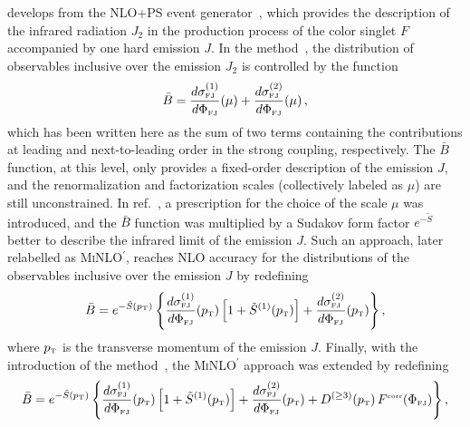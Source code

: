 \documentclass[11pt,a4paper]{article}
\begin{document}
\minnlo{} develops from the NLO+PS \POWHEG{} event
generator~\cite{Alioli:2010xd}, which provides the description of the
infrared radiation $J_2$ in the production process of the color
singlet $F$ accompanied by one hard emission $J$. In the \POWHEG{}
method~\cite{Frixione:2007vw}, the distribution of observables
inclusive over the emission $J_2$ is controlled by the function
\begin{equation}
  \bar{B} = \frac{d\sigma_{\scriptscriptstyle\rm
      FJ}^{(1)}}{d\Phi_{\scriptscriptstyle\rm FJ}}\!\left(\mu\right) +
  \frac{d\sigma_{\scriptscriptstyle\rm
      FJ}^{(2)}}{d\Phi_{\scriptscriptstyle\rm FJ}}\!\left(\mu\right),
\end{equation}
which has been written here as the sum of two terms containing the
contributions at leading and next-to-leading order in the strong
coupling, respectively. The $\bar{B}$ function, at this level, only
provides a fixed-order description of the emission $J$, and the
renormalization and factorization scales (collectively labeled as
$\mu$) are still unconstrained. In ref.~\cite{Hamilton:2012rf}, a
prescription for the choice of the scale $\mu$ was introduced, and the
$\bar{B}$ function was multiplied by a Sudakov form factor
$e^{-\tilde{S}}$ better to describe the infrared limit of the emission
$J$. Such an approach, later relabelled as {\small
  \textsc{MiNLO$^\prime$}}, reaches NLO accuracy for the distributions
of the observables inclusive over the emission $J$ by redefining
\begin{equation}
  \bar{B} = e^{-\tilde{S}\left(p_{\scriptscriptstyle\rm T}\right)}
  \left\{\frac{d\sigma_{\scriptscriptstyle\rm
      FJ}^{(1)}}{d\Phi_{\scriptscriptstyle\rm
      FJ}}\!\left(p_{\scriptscriptstyle\rm T}\right) \left[1 +
    \tilde{S}^{(1)}\!\left(p_{\scriptscriptstyle\rm T}\right)\right] +
  \frac{d\sigma_{\scriptscriptstyle\rm
      FJ}^{(2)}}{d\Phi_{\scriptscriptstyle\rm
      FJ}}\!\left(p_{\scriptscriptstyle\rm T}\right)\right\},
\end{equation}
where $p_{\scriptscriptstyle\rm T}$ is the transverse momentum of the
emission $J$. Finally, with the introduction of the \minnlo{}
method~\cite{Monni:2019whf,Monni:2020nks}, the {\small
  \textsc{MiNLO$^\prime$}} approach was extended by redefining
\begin{equation}
  \label{MiNNLOPS_cross_section}
  \bar{B} = e^{-\tilde{S}\left(p_{\scriptscriptstyle\rm T}\right)}
  \left\{\frac{d\sigma_{\scriptscriptstyle\rm
      FJ}^{(1)}}{d\Phi_{\scriptscriptstyle\rm
      FJ}}\!\left(p_{\scriptscriptstyle\rm T}\right) \left[1 +
    \tilde{S}^{(1)}\!\left(p_{\scriptscriptstyle\rm T}\right)\right] +
  \frac{d\sigma_{\scriptscriptstyle\rm
      FJ}^{(2)}}{d\Phi_{\scriptscriptstyle\rm
      FJ}}\!\left(p_{\scriptscriptstyle\rm T}\right) + D^{(\geq
    3)}\!\left(p_{\scriptscriptstyle\rm T}\right)
  F^{\scriptscriptstyle\rm corr}\!\left(\Phi_{\scriptscriptstyle\rm
    FJ}\right)\right\},
\end{equation}
\end{document}
